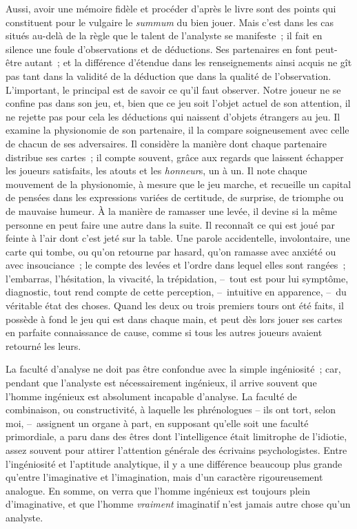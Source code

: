 \documentclass[french,twoside]{book} %
\begin{document}
Aussi, avoir une mémoire fidèle et procéder d’après le livre sont des points qui constituent pour le vulgaire le \emph{summum} du bien jouer. Mais c’est dans les cas situés au-delà de la règle que le talent de l’analyste se manifeste ; il fait en silence une foule d’observations et de déductions. Ses partenaires en font peut-être autant ; et la différence d’étendue dans les renseignements ainsi acquis ne gît pas tant dans la validité de la déduction que dans la qualité de l’observation. L’important, le principal est de savoir ce qu’il faut observer. Notre joueur ne se confine pas dans son jeu, et, bien que ce jeu soit l’objet actuel de son attention, il ne rejette pas pour cela les déductions qui naissent d’objets étrangers au jeu. Il examine la physionomie de son partenaire, il la compare soigneusement avec celle de chacun de ses adversaires. Il considère la manière dont chaque partenaire distribue ses cartes ; il compte souvent, grâce aux regards que laissent échapper les joueurs satisfaits, les atouts et les \emph{honneur}s, un à un. Il note chaque mouvement de la physionomie, à mesure que le jeu marche, et recueille un capital de pensées dans les expressions variées de certitude, de surprise, de triomphe ou de mauvaise humeur. À la manière de ramasser une levée, il devine si la même personne en peut faire une autre dans la suite. Il reconnaît ce qui est joué par feinte à l’air dont c’est jeté sur la table. Une parole accidentelle, involontaire, une carte qui tombe, ou qu’on retourne par hasard, qu’on ramasse avec anxiété ou avec insouciance ; le compte des levées et l’ordre dans lequel elles sont rangées ; l’embarras, l’hésitation, la vivacité, la trépidation, – tout est pour lui symptôme, diagnostic, tout rend compte de cette perception, – intuitive en apparence, – du véritable état des choses. Quand les deux ou trois premiers tours ont été faits, il possède à fond le jeu qui est dans chaque main, et peut dès lors jouer ses cartes en parfaite connaissance de cause, comme si tous les autres joueurs avaient retourné les leurs.\par
La faculté d’analyse ne doit pas être confondue avec la simple ingéniosité ; car, pendant que l’analyste est nécessairement ingénieux, il arrive souvent que l’homme ingénieux est absolument incapable d’analyse. La faculté de combinaison, ou constructivité, à laquelle les phrénologues – ils ont tort, selon moi, – assignent un organe à part, en supposant qu’elle soit une faculté primordiale, a paru dans des êtres dont l’intelligence était limitrophe de l’idiotie, assez souvent pour attirer l’attention générale des écrivains psychologistes. Entre l’ingéniosité et l’aptitude analytique, il y a une différence beaucoup plus grande qu’entre l’imaginative et l’imagination, mais d’un caractère rigoureusement analogue. En somme, on verra que l’homme ingénieux est toujours plein d’imaginative, et que l’homme \emph{vraiment} imaginatif n’est jamais autre chose qu’un analyste.\par
\end{document}
